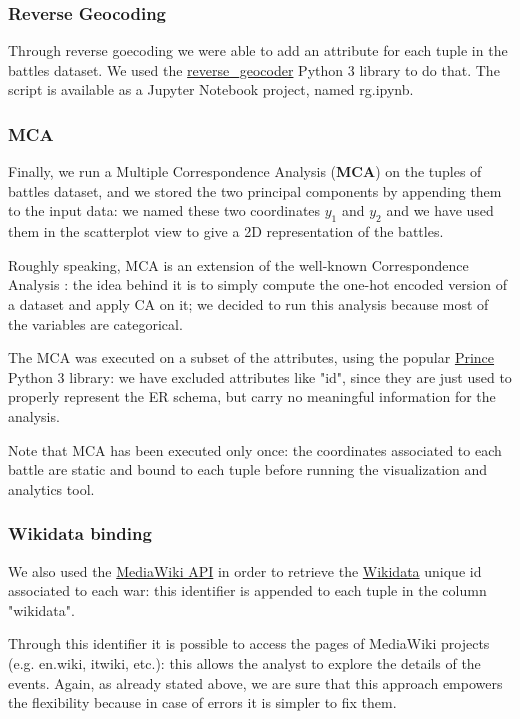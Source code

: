 \subsubsection{Reverse Geocoding}
Through reverse goecoding we were able to add an attribute for each tuple in the battles dataset. We used the \href{https://pypi.org/project/reverse_geocoder/}{reverse\_geocoder} Python 3 library to do that. The script is available as a Jupyter Notebook project, named rg.ipynb. 

\subsubsection{MCA}
Finally, we run a Multiple Correspondence Analysis (\textbf{MCA}) \cite{HD07} on the tuples of battles dataset, and we stored the two principal components by appending them to the input data: we named these two coordinates $y_1$ and $y_2$ and we have used them in the scatterplot view to give a 2D representation of the battles.

Roughly speaking, MCA is an extension of the well-known Correspondence Analysis \cite{Hill74}: the idea behind it is to simply compute the one-hot encoded version of a dataset and apply CA on it; we decided to run this analysis because most of the variables are categorical.

The MCA was executed on a subset of the attributes, using the popular \href{https://pypi.org/project/prince}{Prince} Python 3 library: we have excluded attributes like "id", since they are just used to properly represent the ER schema, but carry no meaningful information for the analysis.

Note that MCA has been executed only once: the coordinates associated to each battle are static and bound to each tuple before running the visualization and analytics tool.

\subsubsection{Wikidata binding}
We also used the \href{https://www.mediawiki.org/wiki/API:Main_page}{MediaWiki API} in order to retrieve the \href{https://wikidata.org}{Wikidata} unique id associated to each war: this identifier is appended to each tuple in the column "wikidata".

Through this identifier it is possible to access the pages of MediaWiki projects (e.g. en.wiki, itwiki, etc.): this allows the analyst to explore the details of the events. Again, as already stated above, we are sure that this approach empowers the flexibility because in case of errors it is simpler to fix them.
